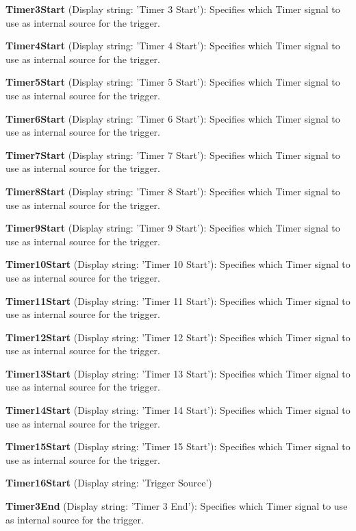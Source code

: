 \begin{DoxyItemize}
\item {\bfseries Timer3\+Start} (Display string\+: 'Timer 3 Start')\+: Specifies which Timer signal to use as internal source for the trigger.
\item {\bfseries Timer4\+Start} (Display string\+: 'Timer 4 Start')\+: Specifies which Timer signal to use as internal source for the trigger.
\item {\bfseries Timer5\+Start} (Display string\+: 'Timer 5 Start')\+: Specifies which Timer signal to use as internal source for the trigger.
\item {\bfseries Timer6\+Start} (Display string\+: 'Timer 6 Start')\+: Specifies which Timer signal to use as internal source for the trigger.
\item {\bfseries Timer7\+Start} (Display string\+: 'Timer 7 Start')\+: Specifies which Timer signal to use as internal source for the trigger.
\item {\bfseries Timer8\+Start} (Display string\+: 'Timer 8 Start')\+: Specifies which Timer signal to use as internal source for the trigger.
\item {\bfseries Timer9\+Start} (Display string\+: 'Timer 9 Start')\+: Specifies which Timer signal to use as internal source for the trigger.
\item {\bfseries Timer10\+Start} (Display string\+: 'Timer 10 Start')\+: Specifies which Timer signal to use as internal source for the trigger.
\item {\bfseries Timer11\+Start} (Display string\+: 'Timer 11 Start')\+: Specifies which Timer signal to use as internal source for the trigger.
\item {\bfseries Timer12\+Start} (Display string\+: 'Timer 12 Start')\+: Specifies which Timer signal to use as internal source for the trigger.
\item {\bfseries Timer13\+Start} (Display string\+: 'Timer 13 Start')\+: Specifies which Timer signal to use as internal source for the trigger.
\item {\bfseries Timer14\+Start} (Display string\+: 'Timer 14 Start')\+: Specifies which Timer signal to use as internal source for the trigger.
\item {\bfseries Timer15\+Start} (Display string\+: 'Timer 15 Start')\+: Specifies which Timer signal to use as internal source for the trigger.
\item {\bfseries Timer16\+Start} (Display string\+: 'Trigger Source')
\item {\bfseries Timer3\+End} (Display string\+: 'Timer 3 End')\+: Specifies which Timer signal to use as internal source for the trigger.

\end{DoxyItemize}
